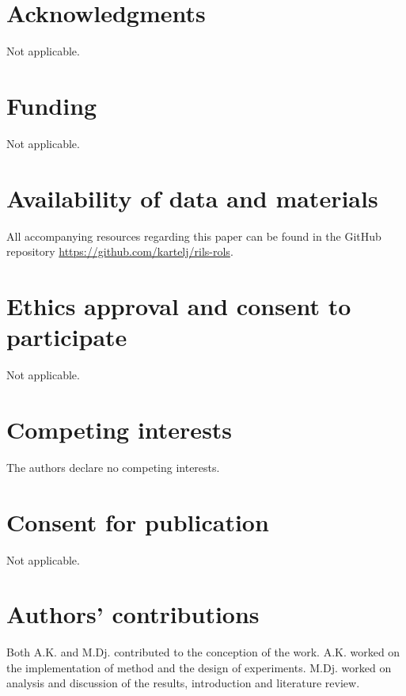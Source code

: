 \documentclass{bmcart}
\begin{document}
\begin{backmatter}

 \section*{Acknowledgments}%
Not applicable.

 \section*{Funding}%
Not applicable.


  \section*{Availability of data and materials}%
 All accompanying resources regarding this paper can be found in the GitHub repository \url{https://github.com/kartelj/rils-rols}. 

\section*{Ethics approval and consent to participate}%
Not applicable. 

\section*{Competing interests}
The authors declare  no competing interests.

\section*{Consent for publication}%
Not applicable. 

\section*{Authors' contributions}
Both A.K. and M.Dj. contributed to the conception of the work. A.K. worked on the implementation of method and the design of experiments. M.Dj. worked on analysis and discussion of the results, introduction and literature review. 



\end{backmatter}
\end{document}

